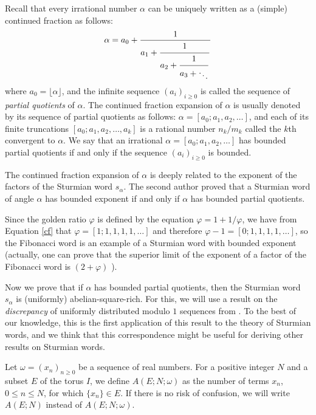 \documentclass[11pt,reqno]{amsart}
\numberwithin{equation}{section}
\theoremstyle{plain}
\theoremstyle{definition}
\theoremstyle{remark}
\renewcommand{\phi}{\varphi}
\begin{document}
Recall that every irrational number $\alpha$ can be uniquely written as a (simple) continued fraction as follows:
\begin{equation}\label{cf}
\alpha = 
a_0+{1\over\displaystyle a_1+
        {\strut 1\over\displaystyle a_2+
	          {\strut 1\over\displaystyle a_3+ 
		  \raisebox{-1ex}{$\ddots$} }}}
\end{equation}
where $a_{0}=\lfloor \alpha \rfloor$, and the infinite sequence $(a_{i})_{i\geq 0}$ is called the sequence of {\it partial quotients\/} of $\alpha$. The continued fraction expansion of $\alpha$ is usually denoted by its sequence of partial quotients as follows: $\alpha=[a_{0};a_{1},a_{2},\ldots ]$, and each of its finite truncations $[a_{0};a_{1},a_{2},\ldots,a_{k}]$ is a rational number $n_{k}/m_{k}$ called the $k$th convergent to $\alpha$. We say that an irrational $\alpha=[a_{0};a_{1},a_{2},\ldots ]$ has bounded partial quotients if and only if the sequence $(a_{i})_{i\geq 0}$ is bounded.  

The continued fraction expansion of $\alpha$ is deeply related to the exponent of the factors of the Sturmian word $s_{\alpha}$. 
The second author \cite{Mi89} proved that a Sturmian word of angle $\alpha$ has bounded exponent if and only if $\alpha$ has bounded partial quotients.

Since the golden ratio $\phi$ is defined by the equation $\phi=1+1/\phi$, we have from Equation \ref{cf} that $\phi=[1;1,1,1,1,\ldots]$ and therefore $\phi-1=[0;1,1,1,1,\ldots]$, so the Fibonacci word is an example of a Sturmian word with bounded exponent (actually, one can prove that the superior limit of the exponent of a factor of the Fibonacci word is $(2+\phi)$ \cite{MignosiPirillo}).

Now we prove that if $\alpha$ has bounded partial quotients, then the Sturmian word  $s_{\alpha}$ is (uniformly) abelian-square-rich. For this, we will use a result on the {\it discrepancy\/} of uniformly distributed modulo $1$ sequences from \cite{KuNi}. To the best of our knowledge, this is the first application of this result to the theory of Sturmian words, and we think that this correspondence might be useful for deriving other results on Sturmian words.

Let $\omega=(x_n)_{n\geq 0}$ be a sequence of real numbers. For a positive integer $N$ and a subset $E$ of the torus $I$, we define $A(E;N;\omega)$ as the number of terms $x_n$, $0\leq n\leq N$, for which $\{x_n\}\in E$. If there is no risk of confusion, we will write $A(E;N)$ instead of $A(E;N;\omega)$.
\end{document}
